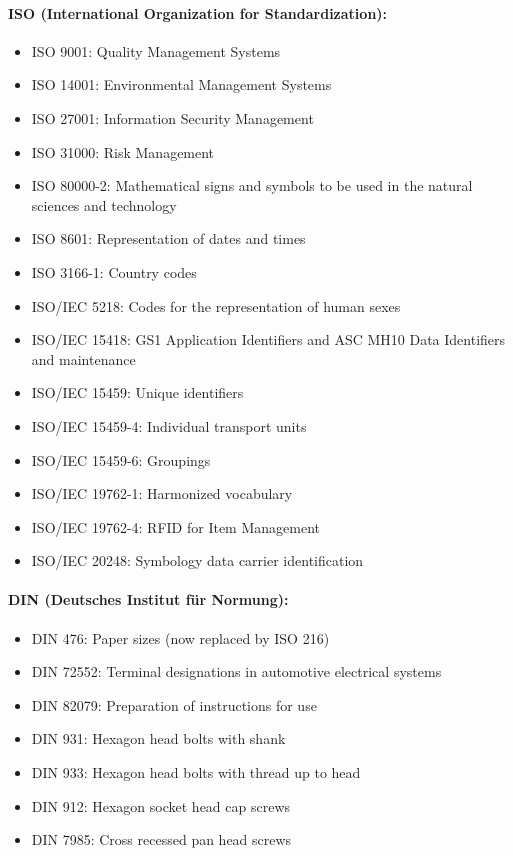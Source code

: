 \paragraph{ISO (International Organization for Standardization):}
\begin{itemize}
    \item ISO 9001: Quality Management Systems
    \item ISO 14001: Environmental Management Systems
    \item ISO 27001: Information Security Management
    \item ISO 31000: Risk Management
    \item ISO 80000-2: Mathematical signs and symbols to be used in the natural sciences and technology
    \item ISO 8601: Representation of dates and times
    \item ISO 3166-1: Country codes
    \item ISO/IEC 5218: Codes for the representation of human sexes
    \item ISO/IEC 15418: GS1 Application Identifiers and ASC MH10 Data Identifiers and maintenance
    \item ISO/IEC 15459: Unique identifiers
    \item ISO/IEC 15459-4: Individual transport units
    \item ISO/IEC 15459-6: Groupings
    \item ISO/IEC 19762-1: Harmonized vocabulary
    \item ISO/IEC 19762-4: RFID for Item Management
    \item ISO/IEC 20248: Symbology data carrier identification
\end{itemize}

\paragraph{DIN (Deutsches Institut für Normung):}
\begin{itemize}
    \item DIN 476: Paper sizes (now replaced by ISO 216)
    \item DIN 72552: Terminal designations in automotive electrical systems
    \item DIN 82079: Preparation of instructions for use
    \item DIN 931: Hexagon head bolts with shank
    \item DIN 933: Hexagon head bolts with thread up to head
    \item DIN 912: Hexagon socket head cap screws
    \item DIN 7985: Cross recessed pan head screws
\end{itemize}

